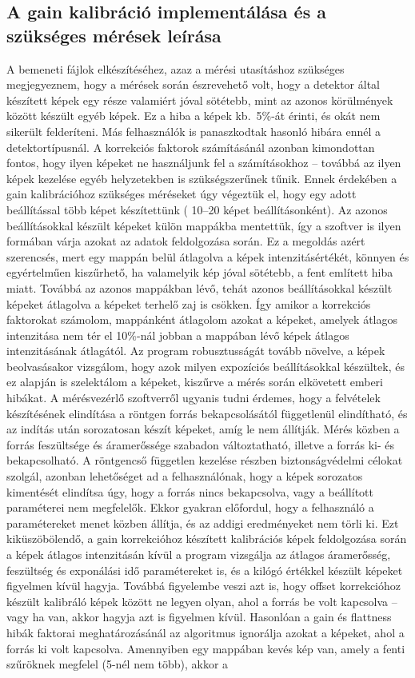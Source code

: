 \documentclass[a4paper,12pt,twoside]{article}
\begin{document}
 
\subsection{A gain kalibráció implementálása és a szükséges mérések leírása} 
 
 
A bemeneti fájlok elkészítéséhez, azaz a mérési utasításhoz szükséges megjegyeznem, hogy a mérések során észrevehető volt, hogy a detektor által készített képek egy része valamiért jóval sötétebb, mint az azonos körülmények között készült egyéb képek. Ez a hiba a képek kb.\ 5\%-át érinti, és okát nem sikerült felderíteni. Más felhasználók is panaszkodtak hasonló hibára ennél a detektortípusnál. A korrekciós faktorok számításánál azonban kimondottan fontos, hogy ilyen képeket ne használjunk fel a számításokhoz -- továbbá az ilyen képek kezelése egyéb helyzetekben is szükségszerűnek tűnik. Ennek érdekében a gain kalibrációhoz szükséges méréseket úgy végeztük el, hogy egy adott beállítással több képet készítettünk ( 10--20 képet beállításonként). Az azonos beállításokkal készült képeket külön mappákba mentettük, így a szoftver is ilyen formában várja azokat az adatok feldolgozása során. Ez a megoldás azért szerencsés, mert egy mappán belül átlagolva a képek intenzitásértékét, könnyen és egyértelműen kiszűrhető, ha valamelyik kép jóval sötétebb, a fent említett hiba miatt. Továbbá az azonos mappákban lévő, tehát azonos beállításokkal készült képeket átlagolva a képeket terhelő zaj is csökken. Így amikor a korrekciós faktorokat számolom, mappánként átlagolom azokat a képeket, amelyek átlagos intenzitása nem tér el 10\%-nál jobban a mappában lévő képek átlagos intenzitásának átlagától. Az program  robusztusságát  tovább növelve, a képek beolvasásakor vizsgálom, hogy  azok milyen expozíciós beállításokkal készültek, és ez alapján is szelektálom a képeket, kiszűrve a mérés során elkövetett emberi hibákat. A mérésvezérlő szoftverről ugyanis tudni érdemes, hogy a felvételek készítésének elindítása a röntgen forrás bekapcsolásától függetlenül elindítható, és az indítás után sorozatosan készít képeket, amíg le nem állítják. Mérés közben a forrás feszültsége és áramerőssége szabadon változtatható, illetve a forrás ki- és bekapcsolható. A röntgencső független kezelése részben biztonságvédelmi célokat szolgál, azonban lehetőséget ad a felhasználónak, hogy a képek sorozatos kimentését elindítsa úgy, hogy a forrás nincs bekapcsolva, vagy a beállított paraméterei nem megfelelők. Ekkor gyakran előfordul, hogy a felhasználó a paramétereket menet közben állítja, és az addigi eredményeket nem törli ki. Ezt kiküszöbölendő, a gain korrekcióhoz készített kalibrációs képek feldolgozása során a képek átlagos intenzitásán kívül a program vizsgálja az átlagos áramerősség, feszültség és exponálási idő paramétereket is, és a kilógó értékkel készült képeket figyelmen kívül hagyja. Továbbá figyelembe veszi azt is, hogy offset korrekcióhoz készült kalibráló képek között ne legyen olyan, ahol a forrás be volt kapcsolva -- vagy ha van, akkor hagyja azt is figyelmen kívül. Hasonlóan a gain és flattness hibák faktorai meghatározásánál az algoritmus ignorálja azokat a képeket, ahol a forrás ki volt kapcsolva. Amennyiben egy mappában kevés kép van, amely a fenti szűröknek megfelel (5-nél nem több), akkor a 
\end{document}
